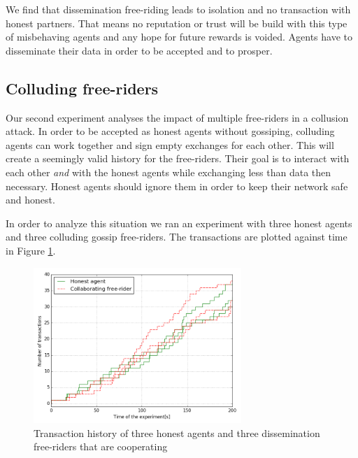 
We find that dissemination free-riding leads to isolation and no transaction with honest partners. 
That means no reputation or trust will be build with this type of misbehaving agents and any hope for
future rewards is voided. Agents have to disseminate their data in order to be accepted and to prosper.

\subsection{Colluding free-riders}
Our second experiment analyses the impact of multiple free-riders in a collusion attack. In order to
be accepted as honest agents without gossiping, colluding agents can work together and sign empty exchanges for 
each other. This will create a seemingly valid history for the free-riders. Their goal is to interact 
with each other \textit{and} with the honest agents while exchanging less than data then necessary. Honest agents
should ignore them in order to keep their network safe and honest.

In order to analyze this situation we ran an experiment with three honest agents and three colluding gossip 
free-riders. The transactions are plotted against time in Figure \ref{fig:50percent}.

\begin{figure}[h!]
    \centering
    \includegraphics[width=0.7\textwidth]{images/50percent}
    \caption{Transaction history of three honest agents and three dissemination free-riders
    that are cooperating}
    \label{fig:50percent}
\end{figure}

